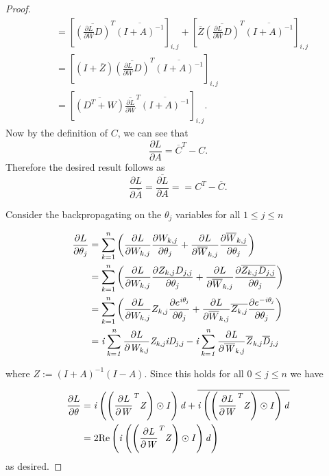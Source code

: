 \documentclass[letterpaper]{article} %
\begin{document}
\begin{proof}
\begin{align*}
&= \left[\overline{\left(\frac{\partial L}{\partial W} D\right)}^T \overline{(I+A)^{-1}} \right]_{i,j}  
+ \left[\overline{Z} \overline{\left(\frac{\partial L}{\partial W} D\right)}^T \overline{(I+A)^{-1}}\right]_{i,j}\\
&=\left[ (I+\overline{Z}) \overline{\left(\frac{\partial L}{\partial W} D\right)}^T \overline{(I+A)^{-1}} \right]_{i,j} \\
&= \left[ \overline{(D^T+W)} \overline{\frac{\partial L}{\partial W}}^T\overline{(I+A)^{-1}}\right]_{i,j}.
\end{align*}
Now by the definition of $C$, we can see that 
$$\frac{\partial L}{\partial A} = \overline{C}^T -C. $$
Therefore the desired result follows as
$$ \frac{\partial L}{\partial \overline{A}} = \overline{\frac{\partial L}{\partial A}} = = C^T -\overline{C}. $$

Consider the backpropagating on the $\theta_j$ variables for all $1 \leq j \leq n$  

\begin{align*}
\frac{\partial L}{\partial \theta_{j}} &= \sum_{k = 1}^{n} \left(\frac{\partial L}{\partial W_{k, j}}
\frac{\partial W_{k, j}}{\partial \theta_j} 
+ \frac{\partial L}{\partial \overline{W}_{k,j}} \frac{\partial \overline{W}_{k, j}}{\partial \theta_j}\right) \\
 &= \sum_{k = 1}^{n} \left(\frac{\partial L}{\partial W_{k, j}}
\frac{\partial Z_{k, j}D_{j,j}}{\partial \theta_j} 
+ \frac{\partial L}{\partial \overline{W}_{k,j}} \frac{\partial \overline{Z_{k, j}D_{j,j}}}{\partial \theta_j}\right) \\
 &= \sum_{k = 1}^{n} \left(\frac{\partial L}{\partial W_{k, j}}
Z_{k, j}\frac{\partial e^{\it{i}\theta_j}}{\partial \theta_j} 
+ \frac{\partial L}{\partial \overline{W}_{k,j}} \overline{Z_{k, j}}\frac{\partial e^{-\it{i}\theta_j}}{\partial \theta_j}\right) \\
 &= \it{i}\sum_{k = 1}^{n} \frac{\partial L}{\partial W_{k, j}}Z_{k, j}\it{i}D_{j,j} -\it{i}\sum_{k = 1}^{n} \frac{\partial L}{\partial \overline{W}_{k,j}}\overline{Z}
_{k,j}\overline{D}_{j,j}
\end{align*}

\noindent where $Z := \left(I + A\right)^{-1}\left(I - A\right)$.  Since this holds for all $0 \leq j \leq n$ we have

\begin{align*}
\frac{\partial L}{\partial \theta} &= \it{i} \left( \left(\frac{\partial L}{\partial W}^{T}Z \right)\odot I\right)d+ \overline{\it{i} \left( \left(\frac{\partial L}{\partial W}^{T}Z \right)\odot I\right)d}\\
&= 2\text{Re}\left(\it{i} \left( \left(\frac{\partial L}{\partial W}^{T}Z \right)\odot I\right)d \right)
\end{align*}
as desired.
\end{proof}



\end{document}
